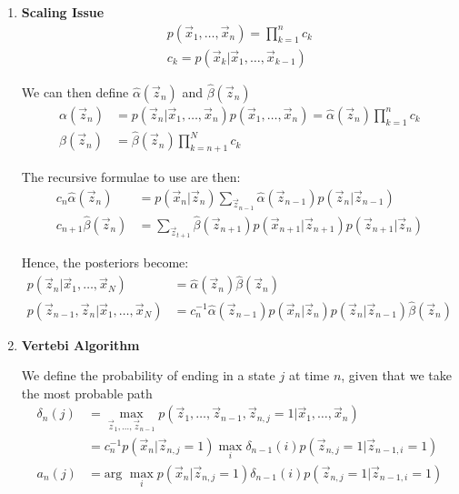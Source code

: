 \documentclass[12pt,twoside]{article}
\begin{document}
\begin{enumerate}
\item \textbf{Scaling Issue}
\begin{align*}
	p(\vec{x}_1,\ldots , \vec{x}_n) = \prod_{k=1}^n c_k\\
	c_k = p(\vec{x}_k \vert \vec{x}_1, \ldots, \vec{x}_{k-1})
\end{align*}

We can then define $\hat{\alpha}(\vec{z}_n)$ and $\hat{\beta}(\vec{z}_n)$
\begin{align*}
	\alpha(\vec{z}_n) & = p(\vec{z}_n \vert \vec{x}_1, \ldots, \vec{x}_n) p(\vec{x}_1,\ldots, \vec{x}_n) = \hat{\alpha}(\vec{z}_n) \prod_{k=1}^n c_k\\
	\beta (\vec{z}_n) & = \hat{\beta}(\vec{z}_n) \prod_{k=n+1}^N c_k
\end{align*}

The recursive formulae to use are then:
\begin{align*}
c_n\hat{\alpha}(\vec{z}_n) &= p(\vec{x}_n\vert \vec{z}_n) \sum_{\vec{z}_{n-1}}\hat{\alpha}(\vec{z}_{n-1})p(\vec{z}_n \vert \vec{z}_{n-1})\\
c_{n+1}\hat{\beta}(\vec{z}_n) & = \sum_{\vec{z}_{t+1}} \hat{\beta}(\vec{z}_{n+1})p(\vec{x}_{n+1}\vert \vec{z}_{n+1}) p(\vec{z}_{n+1}\vert \vec{z}_n)
\end{align*}

Hence, the posteriors become:
\begin{align*}
	p(\vec{z}_n \vert \vec{x}_1, \ldots, \vec{x}_N) &= \hat{\alpha}(\vec{z}_n)\hat{\beta}(\vec{z}_n)\\
	p(\vec{z}_{n-1}, \vec{z}_n \vert \vec{x}_1, \ldots, \vec{x}_N) &= c_n^{-1}\hat{\alpha}(\vec{z}_{n-1})p(\vec{x}_n\vert \vec{z}_n)p(\vec{z}_n\vert \vec{z}_{n-1})\hat{\beta}(\vec{z}_{n})
\end{align*}

\item \textbf{Vertebi Algorithm}

We define the probability of ending in a state $j$ at time $n$, given that we take the most probable path
\begin{align*}
	\delta_n(j) 
	&= \max_{\vec{z}_1, \ldots, \vec{z}_{n-1}} p(\vec{z}_1, \ldots, \vec{z}_{n-1}, \vec{z}_{n,j}=1\vert \vec{x}_1,\ldots, \vec{x}_n)\\
	&= c_n^{-1} p(\vec{x}_n \vert \vec{z}_{n, j}=1)\max_{i} \delta_{n-1}(i) p(\vec{z}_{n,j}=1 \vert \vec{z}_{n-1,i}=1) \\
	a_n(j)& = \text{arg } \max_i p(\vec{x}_n\vert \vec{z}_{n,j} =1) \delta_{n-1}(i)p(\vec{z}_{n,j}=1 \vert \vec{z}_{n-1,i}=1)
\end{align*}

\end{enumerate}
\end{document}
